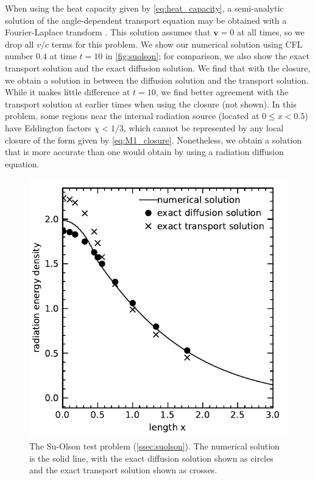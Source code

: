 \documentclass[fleqn,usenatbib]{mnras}
\newcommand{\vc}[1]{{\mathbf{#1}}}
\begin{document}
When using the heat capacity given by \autoref{eq:heat_capacity}, a semi-analytic solution of the angle-dependent transport equation may be obtained with a Fourier-Laplace transform \citep{Su_1997}. This solution assumes that $\vc{v} = 0$ at all times, so we drop all $v/c$ terms for this problem. We show our numerical solution using CFL number $0.4$ at time $t = 10$  in \autoref{fig:suolson}; for comparison, we also show the exact transport solution and the exact diffusion solution. We find that with the \cite{Levermore_1984} closure, we obtain a solution in between the diffusion solution and the transport solution. While it makes little difference at $t = 10$, we find better agreement with the transport solution at earlier times when using the \cite{Minerbo_1978} closure (not shown). In this problem, some regions near the internal radiation source (located at $0 \leq x < 0.5$) have Eddington factors $\chi < 1/3$, which cannot be represented by any local closure of the form given by \autoref{eq:M1_closure}.  Nonetheless, we obtain a solution that is more accurate than one would obtain by using a radiation diffusion equation.
\begin{figure}
    \includegraphics[width=\columnwidth]{SuOlsonTest.pdf}
    \caption{The Su-Olson test problem (\autoref{ssec:suolson}). The numerical solution is the solid line, with the exact diffusion solution shown as circles and the exact transport solution shown as crosses.}
    \label{fig:suolson}
\end{figure}
\end{document}
